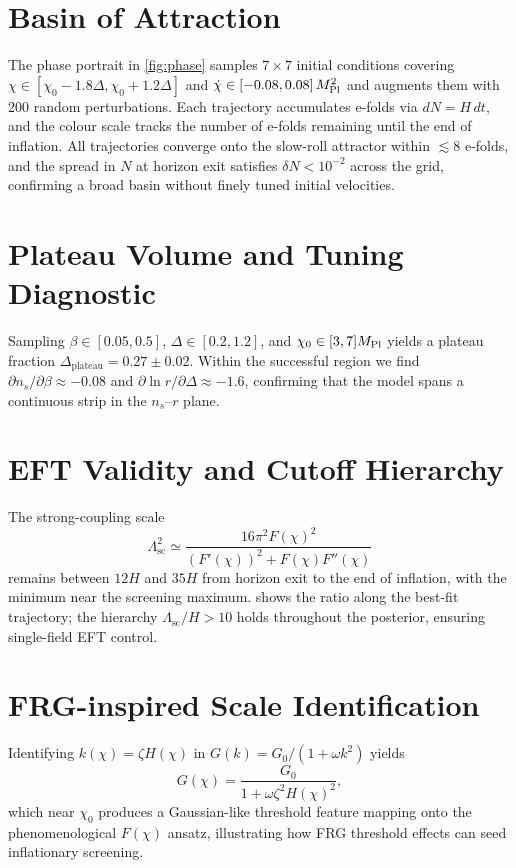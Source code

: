 \documentclass[11pt,a4paper]{article}
\begin{document}
\section{Basin of Attraction}
The phase portrait in \cref{fig:phase} samples $7\times7$ initial conditions covering $\chi\in[\chi_{0}-1.8\Delta,\chi_{0}+1.2\Delta]$ and $\dot{\chi}\in[-0.08,0.08]\,M_{\rm Pl}^{2}$ and augments them with 200 random perturbations. Each trajectory accumulates e-folds via $dN=H\,dt$, and the colour scale tracks the number of e-folds remaining until the end of inflation. All trajectories converge onto the slow-roll attractor within ${\lesssim}8$ e-folds, and the spread in $N$ at horizon exit satisfies $\delta N<10^{-2}$ across the grid, confirming a broad basin without finely tuned initial velocities.

\section{Plateau Volume and Tuning Diagnostic}
Sampling $\beta\in[0.05,0.5]$, $\Delta\in[0.2,1.2]$, and $\chi_{0}\in[3,7]M_{\rm Pl}$ yields a plateau fraction $\Delta_{\text{plateau}}=0.27\pm0.02$. Within the successful region we find $\partial n_{s}/\partial\beta\approx-0.08$ and $\partial\ln r/\partial\Delta\approx-1.6$, confirming that the model spans a continuous strip in the $n_{s}$--$r$ plane.

\section{EFT Validity and Cutoff Hierarchy}
\label{sec:eft}
The strong-coupling scale
\begin{equation}
\Lambda_{\text{sc}}^{2}\simeq \frac{16\pi^{2}F(\chi)^{2}}{\left(F'(\chi)\right)^{2}+F(\chi)F''(\chi)}
\end{equation}
remains between $12H$ and $35H$ from horizon exit to the end of inflation, with the minimum near the screening maximum.  shows the ratio along the best-fit trajectory; the hierarchy $\Lambda_{\text{sc}}/H>10$ holds throughout the posterior, ensuring single-field EFT control.

\section{FRG-inspired Scale Identification}
\label{sec:frg}
Identifying $k(\chi)=\zeta H(\chi)$ in $G(k)=G_{0}/(1+\omega k^{2})$ yields
\begin{equation}
G(\chi)=\frac{G_{0}}{1+\omega\zeta^{2}H(\chi)^{2}},
\end{equation}
which near $\chi_{0}$ produces a Gaussian-like threshold feature mapping onto the phenomenological $F(\chi)$ ansatz, illustrating how FRG threshold effects can seed inflationary screening.
\end{document}
